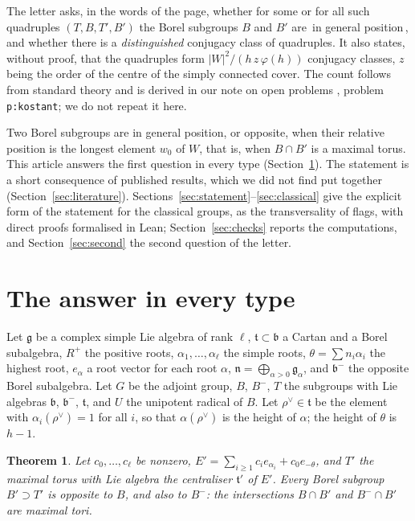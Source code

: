 \documentclass[11pt,a4paper]{amsart}
\newtheorem{theorem}{Theorem}[section]
\theoremstyle{definition}
\theoremstyle{remark}
\newcommand{\q}[1]{\guillemotleft\,#1\,\guillemotright}
\begin{document}
The letter asks, in the words of the page, whether for some or for all such quadruples $(T,B,T',B')$ the Borel subgroups $B$ and $B'$ are \q{in general position}, and whether there is a \emph{distinguished} conjugacy class of quadruples. It also states, without proof, that the quadruples form $|W|^2/(h\,z\,\varphi(h))$ conjugacy classes, $z$ being the order of the centre of the simply connected cover. The count follows from standard theory and is derived in our note on open problems \cite{problems}, problem \texttt{p:kostant}; we do not repeat it here.

Two Borel subgroups are in general position, or opposite, when their relative position is the longest element $w_0$ of $W$, that is, when $B \cap B'$ is a maximal torus. This article answers the first question in every type (Section~\ref{sec:general}). The statement is a short consequence of published results, which we did not find put together (Section~\ref{sec:literature}). Sections~\ref{sec:statement}--\ref{sec:classical} give the explicit form of the statement for the classical groups, as the transversality of flags, with direct proofs formalised in Lean; Section~\ref{sec:checks} reports the computations, and Section~\ref{sec:second} the second question of the letter.

\section{The answer in every type}\label{sec:general}

Let $\mathfrak g$ be a complex simple Lie algebra of rank $\ell$, $\mathfrak t \subset \mathfrak b$ a Cartan and a Borel subalgebra, $R^+$ the positive roots, $\alpha_1,\dots,\alpha_\ell$ the simple roots, $\theta = \sum n_i\alpha_i$ the highest root, $e_\alpha$ a root vector for each root $\alpha$, $\mathfrak n = \bigoplus_{\alpha>0}\mathfrak g_\alpha$, and $\mathfrak b^-$ the opposite Borel subalgebra. Let $G$ be the adjoint group, $B$, $B^-$, $T$ the subgroups with Lie algebras $\mathfrak b$, $\mathfrak b^-$, $\mathfrak t$, and $U$ the unipotent radical of $B$. Let $\rho^\vee \in \mathfrak t$ be the element with $\alpha_i(\rho^\vee) = 1$ for all $i$, so that $\alpha(\rho^\vee)$ is the height of $\alpha$; the height of $\theta$ is $h-1$.

\begin{theorem}\label{thm:general}
Let $c_0,\dots,c_\ell$ be nonzero, $E' = \sum_{i\ge1} c_i e_{\alpha_i} + c_0 e_{-\theta}$, and $T'$ the maximal torus with Lie algebra the centraliser $\mathfrak t'$ of $E'$. Every Borel subgroup $B' \supset T'$ is opposite to $B$, and also to $B^-$: the intersections $B \cap B'$ and $B^- \cap B'$ are maximal tori.
\end{theorem}
\end{document}

